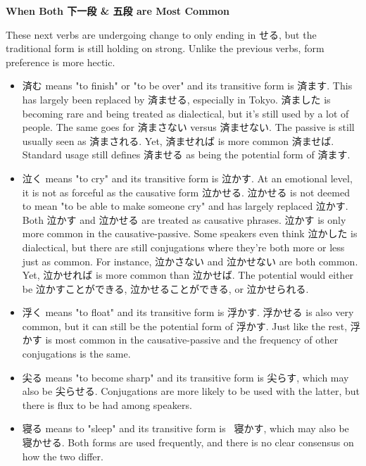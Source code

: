 \begin{center}
\textbf{When Both 下一段 \& 五段 are Most Common }
\end{center}

\par{ These next verbs are undergoing change to only ending in せる, but the traditional form is still holding on strong. Unlike the previous verbs, form preference is more hectic. }

\begin{itemize}

\item 済む means "to finish" or "to be over" and its transitive form is 済ます. This has largely been replaced by 済ませる, especially in Tokyo. 済ました is becoming rare and being treated as dialectical, but it's still used by a lot of people. The same goes for 済まさない versus 済ませない. The passive is still usually seen as 済まされる. Yet, 済ませれば is more common 済ませば. \hfill\break
Standard usage still defines 済ませる as being the potential form of 済ます. 
\item 泣く means "to cry" and its transitive form is 泣かす. At an emotional level, it is not as forceful as the causative form 泣かせる. 泣かせる is not deemed to mean "to be able to make someone cry" and has largely replaced 泣かす. Both 泣かす and 泣かせる are treated as causative phrases. 泣かす is only more common in the causative-passive. Some speakers even think 泣かした is dialectical, but there are still conjugations where they're both more or less just as common. For instance, 泣かさない and 泣かせない are both common. Yet, 泣かせれば is more common than 泣かせば. The potential would either be 泣かすことができる, 泣かせることができる, or 泣かせられる. 
\item 浮く means "to float" and its transitive form is 浮かす. 浮かせる is also very common, but it can still be the potential form of 浮かす. Just like the rest, 浮かす is most common in the causative-passive and the frequency of other conjugations is the same. 
\item 尖る means "to become sharp" and its transitive form is 尖らす, which may also be 尖らせる. Conjugations are more likely to be used with the latter, but there is flux to be had among speakers. 
\item 寝る means to "sleep" and its transitive form is  寝かす, which may also be 寝かせる. Both forms are used frequently, and there is no clear consensus on how the two differ. 
\end{itemize}
